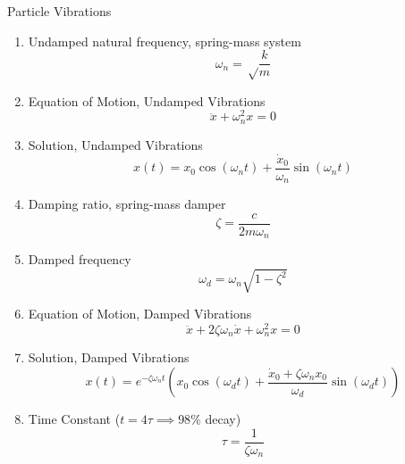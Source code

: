 \begin{multicols*}{2}[]
Particle Vibrations
\vspace{-1em}
\begin{enumerate}
    \item[] Undamped natural frequency, spring-mass system \[\omega_n = \sqrt\frac{k}{m}\]
    \item[] Equation of Motion, Undamped Vibrations \[\ddot x + \omega_n^2x = 0\]
    \item[] Solution, Undamped Vibrations \[x(t) = x_0\cos(\omega_n t)+ \frac{\dot x_0}{\omega_n}\sin(\omega_n t)\]
    \vspace{-2.5em}
    \item[] Damping ratio, spring-mass damper \[\zeta = \frac{c}{2m\omega_n}\]
    \item[] Damped frequency \[\omega_d = \omega_n\sqrt{1-\zeta^2}\]
    \item[] Equation of Motion, Damped Vibrations \[\ddot x + 2\zeta\omega_n \dot x + \omega_n^2x = 0\]
    \item[] Solution, Damped Vibrations \[x(t) = e^{-\zeta\omega_nt}\left(x_0\cos(\omega_d t)+\frac{\dot x_0+\zeta\omega_nx_0}{\omega_d}\sin(\omega_d t)\right)\]
    \item[] Time Constant ($t=4\tau \implies 98\%$ decay) \[\tau = \frac{1}{\zeta\omega_n}\]
\end{enumerate}


\end{multicols*}
